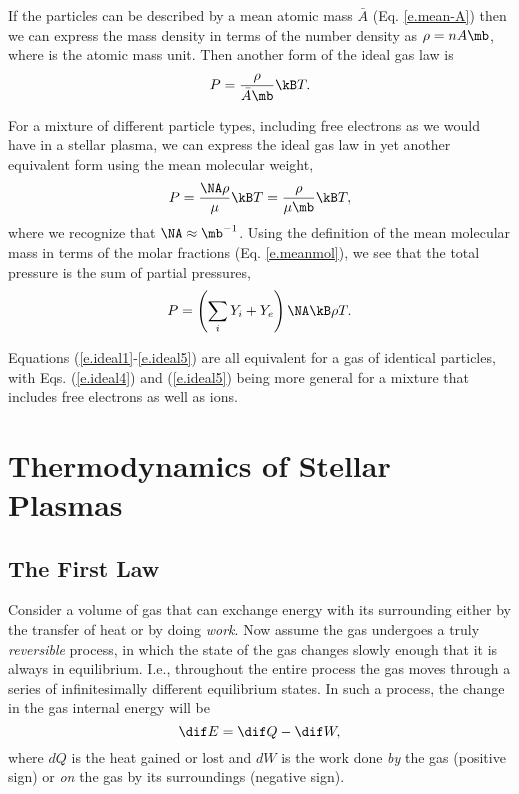 If the particles can be described by a mean atomic mass $\bar{A}$ (Eq. \ref{e.mean-A}) then we can express the mass density in terms of the number density as $\rho = n A \mb$, where \mb is the atomic mass unit. Then another form of the ideal gas law is
\begin{equation}
	P = \frac{\rho}{\bar{A} \mb} \kB T.\label{e.ideal3}
\end{equation}

For a mixture of different particle types, including free electrons as we would have in a stellar plasma, we can express the ideal gas law in yet another equivalent form using the mean molecular weight,
\begin{equation}
	P = \frac{\NA \rho}{\mu} \kB T = \frac{\rho}{\mu \mb} \kB T,\label{e.ideal4}
\end{equation}
where we recognize that $\NA \approx \mb^{-1}$.
Using the definition of the mean molecular mass in terms of the molar fractions (Eq. \ref{e.meanmol}), we see that the total pressure is the sum of partial pressures,
\begin{equation}
	P = \left(\sum_{i}Y_{i} + Y_{e}\right) \NA \kB \rho T.\label{e.ideal5}
\end{equation}

Equations (\ref{e.ideal1}-\ref{e.ideal5}) are all equivalent for a gas of identical particles, with Eqs. (\ref{e.ideal4}) and (\ref{e.ideal5}) being more general for a mixture that includes free electrons as well as ions.

\section{Thermodynamics of Stellar Plasmas} \label{s.thermodynamics}

\subsection{The First Law}
Consider a volume of gas that can exchange energy with its surrounding either by the transfer of heat or by doing {\it work}.
Now assume the gas undergoes a truly {\it reversible} process, in which the state of the gas changes slowly enough that it is always in equilibrium.
I.e., throughout the entire process the gas moves through a series of infinitesimally different equilibrium states.
In such a process, the change in the gas internal energy will be
\begin{equation}
	\dif E = \dif Q - \dif W,
\end{equation}
where $dQ$ is the heat gained or lost and $dW$ is the work done {\it by} the gas (positive sign) or {\it on} the gas by its surroundings (negative sign).

